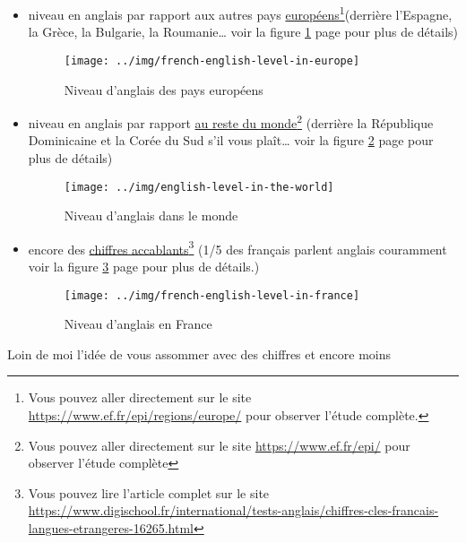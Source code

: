 \begin{itemize}
\item niveau en anglais par rapport aux autres pays
  \href{https://www.ef.fr/epi/regions/europe/}{européens}\footnote{Vous
    pouvez aller directement sur le site
    \url{https://www.ef.fr/epi/regions/europe/} pour observer l'étude complète.}(derrière l'Espagne, la Grèce, la Bulgarie, la Roumanie\ldots{} voir la figure
  \ref{fig:1} page \pageref{fig:1} pour plus de détails)
  \begin{figure}[h]
    \centering
    \caption[L'anglais en Europe]{Niveau d'anglais des
      pays européens}\vspace{.1cm}
    \texttt{[image: ../img/french-english-level-in-europe]}
    
    \label{fig:1}
  \end{figure}
\item niveau en anglais par rapport \href{https://www.ef.fr/epi/}{au
    reste du monde}\footnote{Vous pouvez aller directement sur le site
  \url{https://www.ef.fr/epi/} pour observer l'étude complète}
(derrière la République Dominicaine et la Corée du Sud s'il vous
plaît\ldots{} voir la figure \ref{fig:2} page \pageref{fig:2} pour
plus de détails)
  \begin{figure}[h]
    \centering
    \caption[L'anglais dans le monde]{Niveau d'anglais dans le monde}\vspace{.1cm}
    \texttt{[image: ../img/english-level-in-the-world]}
    
    \label{fig:2}
  \end{figure}
\item encore des
  \href{https://www.digischool.fr/international/tests-anglais/chiffres-cles-francais-langues-etrangeres-16265.html}{chiffres
    accablants}\footnote{Vous pouvez lire l'article complet sur le
    site
    \url{https://www.digischool.fr/international/tests-anglais/chiffres-cles-francais-langues-etrangeres-16265.html}}
    (1/5 des français parlent anglais couramment voir la figure
    \ref{fig:3} page \pageref{fig:3} pour plus de détails.)
  \begin{figure}[h]
    \centering
    \caption[L'anglais en France]{Niveau d'anglais en France}\vspace{.1cm}
    \texttt{[image: ../img/french-english-level-in-france]}
    
    \label{fig:3}
  \end{figure}
\end{itemize}
Loin de moi l'idée de vous assommer avec des chiffres et encore moins

